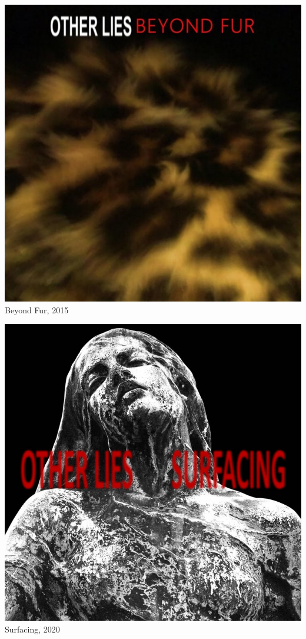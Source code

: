 \begin{titlepage}
  \maketitle
  \thispagestyle{empty}
  \setcounter{page}{0}

  \vspace{2em}
  
  \begin{minipage}[t]{.5\textwidth}
    \centering
    \includegraphics[width=0.8\linewidth]{1-Beyond-Fur/beyond-fur.jpg}
    {\Large \sffamily Beyond Fur, 2015}
  \end{minipage}%
  \begin{minipage}[t]{0.5\textwidth}
    \centering
    \includegraphics[width=0.8\linewidth]{2-Surfacing/surfacing.jpg}
    {\Large \sffamily Surfacing, 2020}
  \end{minipage}
  

\end{titlepage}

